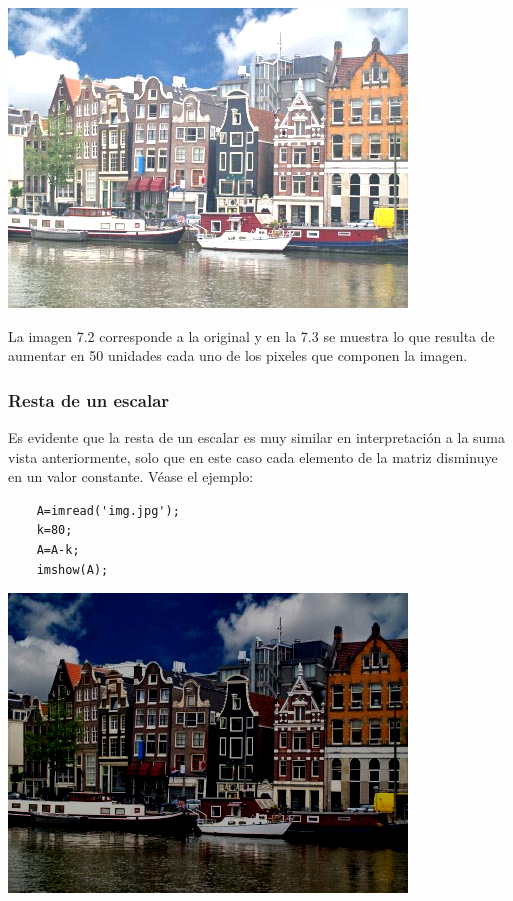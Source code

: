 \begin{center}
\includegraphics[scale=0.7]{src/ch7/holland_mas50.png}
\end{center}

La imagen 7.2 corresponde a la original y en la 7.3 se muestra lo que resulta de aumentar 
en 50 unidades cada uno de los pixeles que componen la imagen.

\subsubsection{Resta de un escalar}

Es evidente que la resta de un escalar es muy similar en interpretación a la suma vista 
anteriormente, solo que en este caso cada elemento de la matriz disminuye en un valor 
constante. Véase el ejemplo:

\begin{verbatim}
	A=imread('img.jpg');
	k=80;
	A=A-k;
	imshow(A);
\end{verbatim}

\begin{center}
\includegraphics[scale=0.7]{src/ch7/holland_menos50.png}
\end{center}

